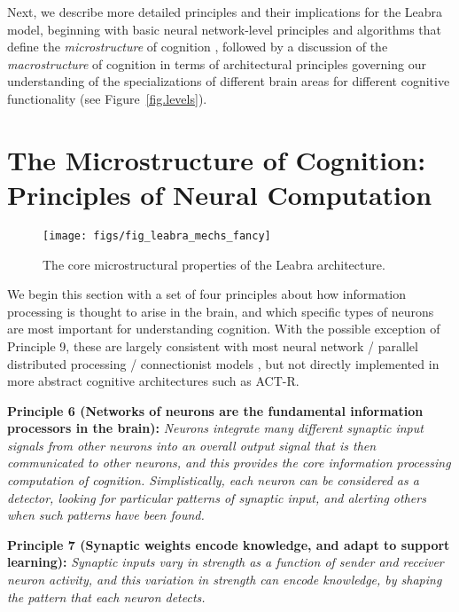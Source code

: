 \documentclass[11pt,twoside]{article}
\begin{document}
Next, we describe more detailed principles and their implications for the
Leabra model, beginning with basic neural network-level principles and
algorithms that define the {\em microstructure} of cognition
\cite[c.f.,]{RumelhartMcClelland86,McClellandRumelhart86,McClellandRumelhart88},
followed by a discussion of the {\em macrostructure} of cognition in terms of
architectural principles governing our understanding of the specializations of
different brain areas for different cognitive functionality (see Figure~\ref{fig.levels}).

\section{The Microstructure of Cognition: Principles of Neural Computation}

\begin{figure}
  \centering\texttt{[image: figs/fig\_leabra\_mechs\_fancy]}
  \caption{\small The core microstructural properties of the Leabra
    architecture.}
  \label{fig.leabra_mechs}
\end{figure}

We begin this section with a set of four principles about how information
processing is thought to arise in the brain, and which specific types of
neurons are most important for understanding cognition. With the possible
exception of Principle 9, these are largely consistent with most neural
network / parallel distributed processing / connectionist models
\cite{McClelland93,McClellandRumelhart86,McClellandRumelhart88,RumelhartMcClelland86,OReilly98}, but not directly implemented in more abstract cognitive architectures such as ACT-R.

{\bf Principle 6 (Networks of neurons are the fundamental information
  processors in the brain):} {\em Neurons integrate many different synaptic
  input signals from other neurons into an overall output signal that is then
  communicated to other neurons, and this provides the core information
  processing computation of cognition.  Simplistically, each neuron can be
  considered as a detector, looking for particular patterns of synaptic input,
  and alerting others when such patterns have been found.}

{\bf Principle 7 (Synaptic weights encode knowledge, and adapt to support
  learning):} {\em Synaptic inputs vary in strength as a function of sender
  and receiver neuron activity, and this variation in strength can encode
  knowledge, by shaping the pattern that each neuron detects.}
\end{document}
